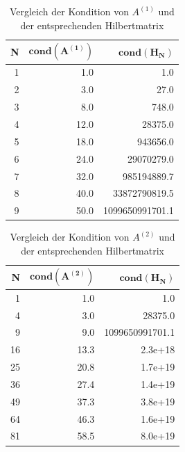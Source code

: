 \documentclass{scrartcl}
\begin{document}
\begin{table}[ht!]
\centering
\begin{tabular}{|r|r|r|}
\hline
\textbf{N} & $\mathbf{cond(A^{(1)})}$ & $\mathbf{cond(H_N)}$   \\ \hline
1          & 1.0                       & 1.0                \\ \hline
2          & 3.0                       & 27.0               \\ \hline
3          & 8.0                       & 748.0              \\ \hline
4          & 12.0                      & 28375.0            \\ \hline
5          & 18.0                      & 943656.0          \\ \hline
6          & 24.0                      & 29070279.0         \\ \hline
7          & 32.0                      & 985194889.7        \\ \hline
8          & 40.0                      & 33872790819.5      \\ \hline
9          & 50.0                      & 1099650991701.1    \\ \hline
\end{tabular}
\caption{Vergleich der Kondition von $A^{(1)}$ und der entsprechenden Hilbertmatrix}
\end{table}

\begin{table}[ht!]
\centering
\begin{tabular}{|r|r|r|}
\hline
\textbf{N} & $\mathbf{cond(A^{(2)})}$  & $\mathbf{cond(H_N)}$       \\ \hline
1          & 1.0                       & 1.0                    \\ \hline
4          & 3.0                       & 28375.0                \\ \hline
9          & 9.0                       & 1099650991701.1        \\ \hline
16         & 13.3                      & 2.3e+18             \\ \hline
25         & 20.8                      & 1.7e+19 \\ \hline
36         & 27.4                      & 1.4e+19  \\ \hline
49         & 37.3                      & 3.8e+19  \\ \hline
64         & 46.3                      & 1.6e+19 \\ \hline
81         & 58.5                      & 8.0e+19  \\ \hline
\end{tabular}
\caption{Vergleich der Kondition von $A^{(2)}$ und der entsprechenden Hilbertmatrix}
\end{table}
\end{document}
